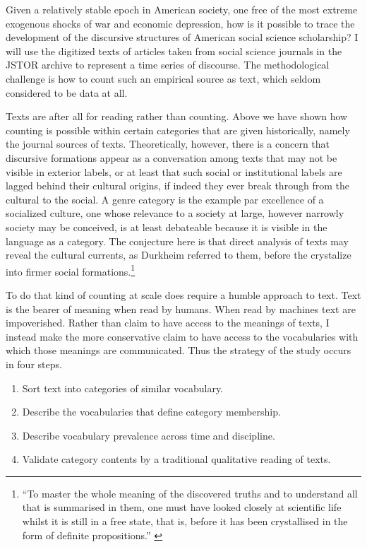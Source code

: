 \documentclass[]{book}
\providecommand{\tightlist}{%
  \setlength{\itemsep}{0pt}\setlength{\parskip}{0pt}}
\let\rmarkdownfootnote\footnote%
\def\footnote{\protect\rmarkdownfootnote}
\theoremstyle{definition}
\theoremstyle{definition}
\theoremstyle{definition}
\theoremstyle{remark}
\begin{document}
Given a relatively stable epoch in American society, one free of the
most extreme exogenous shocks of war and economic depression, how is it
possible to trace the development of the discursive structures of
American social science scholarship? I will use the digitized texts of
articles taken from social science journals in the JSTOR archive to
represent a time series of discourse. The methodological challenge is
how to count such an empirical source as text, which seldom considered
to be data at all.

Texts are after all for reading rather than counting. Above we have
shown how counting is possible within certain categories that are given
historically, namely the journal sources of texts. Theoretically,
however, there is a concern that discursive formations appear as a
conversation among texts that may not be visible in exterior labels, or
at least that such social or institutional labels are lagged behind
their cultural origins, if indeed they ever break through from the
cultural to the social. A genre category is the example par excellence
of a socialized culture, one whose relevance to a society at large,
however narrowly society may be conceived, is at least debateable
because it is visible in the language as a category. The conjecture here
is that direct analysis of texts may reveal the cultural currents, as
Durkheim referred to them, before the crystalize into firmer social
formations.\footnote{``To master the whole meaning of the discovered
  truths and to understand all that is summarised in them, one must have
  looked closely at scientific life whilst it is still in a free state,
  that is, before it has been crystallised in the form of definite
  propositions.'' \citep[\textbackslash299]{Durkheim1893division}}

To do that kind of counting at scale does require a humble approach to
text. Text is the bearer of meaning when read by humans. When read by
machines text are impoverished. Rather than claim to have access to the
meanings of texts, I instead make the more conservative claim to have
access to the vocabularies with which those meanings are communicated.
Thus the strategy of the study occurs in four steps.

\begin{enumerate}
\def\labelenumi{\arabic{enumi}.}
\tightlist
\item
  Sort text into categories of similar vocabulary.
\item
  Describe the vocabularies that define category membership.
\item
  Describe vocabulary prevalence across time and discipline.
\item
  Validate category contents by a traditional qualitative reading of
  texts.
\end{enumerate}
\end{document}
